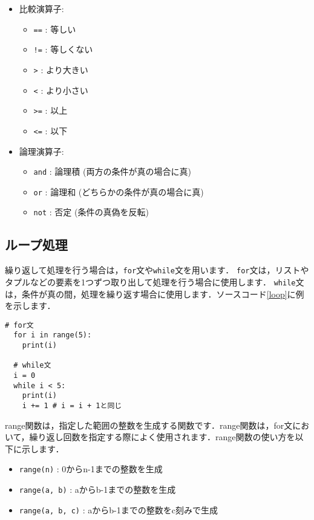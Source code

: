 \documentclass{jarticle}
\begin{document}
\begin{itemize}
  \item 比較演算子:
  \begin{itemize}
    \item \texttt{==} : 等しい
    \item \texttt{!=} : 等しくない
    \item \texttt{>} : より大きい
    \item \texttt{<} : より小さい
    \item \texttt{>=} : 以上
    \item \texttt{<=} : 以下
  \end{itemize}
  \item 論理演算子:
  \begin{itemize}
    \item \texttt{and} : 論理積 (両方の条件が真の場合に真)
    \item \texttt{or} : 論理和 (どちらかの条件が真の場合に真)
    \item \texttt{not} : 否定 (条件の真偽を反転)
  \end{itemize}
\end{itemize}

\subsection{ループ処理}
繰り返して処理を行う場合は，\texttt{for}文や\texttt{while}文を用います．
\texttt{for}文は，リストやタプルなどの要素を1つずつ取り出して処理を行う場合に使用します．
\texttt{while}文は，条件が真の間，処理を繰り返す場合に使用します．ソースコード\ref{loop}に例を示します．
\begin{lstlisting}[caption=ループ処理,label=loop]
  # for文
  for i in range(5):
    print(i)

  # while文
  i = 0
  while i < 5:
    print(i)
    i += 1 # i = i + 1と同じ
\end{lstlisting}

range関数は，指定した範囲の整数を生成する関数です．range関数は，for文において，繰り返し回数を指定する際によく使用されます．range関数の使い方を以下に示します．
\begin{itemize}
  \item \texttt{range(n)} : 0からn-1までの整数を生成
  \item \texttt{range(a, b)} : aからb-1までの整数を生成
  \item \texttt{range(a, b, c)} : aからb-1までの整数をc刻みで生成
\end{itemize}
\end{document}
